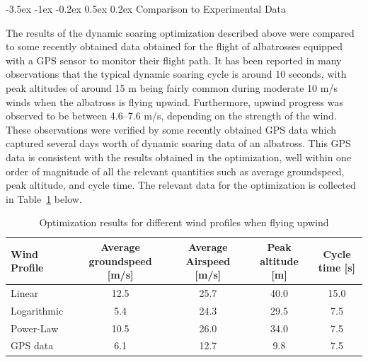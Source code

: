\documentclass[11pt,letterpaper,onecolumn]{article}
\makeatletter
\renewcommand\subsection{\@startsection{subsection}{1}{\z@}%
 {-3.5ex \@plus-1ex \@minus-0.2ex}%
 {0.5ex \@plus0.2ex}%
 {\fontsize{10pt}{10pt}\selectfont\bfseries\sffamily}}
\makeatother
\begin{document}
\subsection{Comparison to Experimental Data}

The results of the dynamic soaring optimization described above were compared to some recently obtained data obtained for the flight of albatrosses equipped with a GPS sensor to monitor their flight path.
It has been reported in many observations that the typical dynamic soaring cycle is around 10 seconds, with peak altitudes of around 15 m being fairly common during moderate 10 m/s winds when the albatross is flying upwind.
Furthermore, upwind progress was observed to be between 4.6--7.6 m/s, depending on the strength of the wind.
These observations were verified by some recently obtained GPS data which captured several days worth of dynamic soaring data of an albatross.\cite{sachs.progress.2011,sachs.experimental.2013} This GPS data is consistent with the results obtained in the optimization, well within one order of magnitude of all the relevant quantities such as average groundspeed, peak altitude, and cycle time.
The relevant data for the optimization is collected in Table~\ref{tab.results} below.

\begin{table}[H]
  \centering
  \caption{Optimization results for different wind profiles when flying upwind}
  \begin{tabular}{lcccc}
    \toprule
    Wind Profile  & Average groundspeed [m/s] & Average Airspeed [m/s]  & Peak altitude [m] & Cycle time [s] \\ \midrule
    Linear        & 12.5                      & 25.7                    & 40.0              & 15.0 \\
    Logarithmic   & 5.4                       & 24.3                    & 29.5              & 7.5 \\
    Power-Law     & 10.5                      & 26.0                    & 34.0              & 7.5 \\ \midrule
    GPS data      & 6.1                       & 12.7                    & 9.8               & 7.5 \\
    \bottomrule
  \end{tabular}\label{tab.results}
\end{table}
\end{document}
